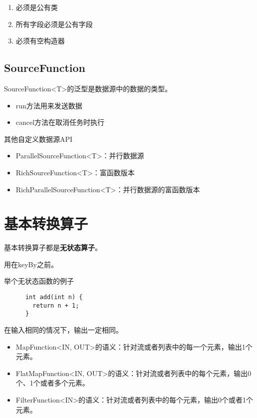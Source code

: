 \documentclass[cn,11pt,chinese]{elegantbook}
\begin{document}
\begin{enumerate}
  \item 必须是公有类
  \item 所有字段必须是公有字段
  \item 必须有空构造器
\end{enumerate}

\subsection{SourceFunction}

SourceFunction<T>的泛型是数据源中的数据的类型。

\begin{itemize}
  \item run方法用来发送数据
  \item cancel方法在取消任务时执行
\end{itemize}

其他自定义数据源API

\begin{itemize}
  \item ParallelSourceFunction<T>：并行数据源
  \item RichSourceFunction<T>：富函数版本
  \item RichParallelSourceFunction<T>：并行数据源的富函数版本
\end{itemize}

\section{基本转换算子}

基本转换算子都是\textbf{无状态算子}。

用在keyBy之前。

举个无状态函数的例子

\begin{lstlisting}
      int add(int n) {
        return n + 1;
      }
\end{lstlisting}

在输入相同的情况下，输出一定相同。

\begin{itemize}
  \item MapFunction<IN, OUT>的语义：针对流或者列表中的每一个元素，输出1个元素。
  \item FlatMapFunction<IN, OUT>的语义：针对流或者列表中的每个元素，输出0个、1个或者多个元素。
  \item FilterFunction<IN>的语义：针对流或者列表中的每个元素，输出0个或者1个元素。
\end{itemize}
\end{document}
